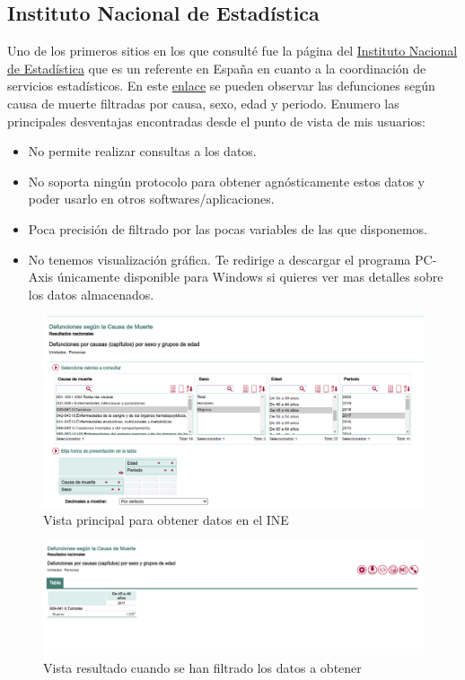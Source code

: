 \subsection{Instituto Nacional de Estadística}
Uno de los primeros sitios en los que consulté fue la página del
\href{https://www.ine.es/index.htm}{Instituto Nacional de Estadística} que es un referente
en España en cuanto a la coordinación de servicios estadísticos. En este
\href{https://www.ine.es/jaxiT3/Tabla.htm?t=6609}{enlace} se pueden observar las
defunciones según causa de muerte filtradas por causa, sexo, edad y periodo. Enumero las
principales desventajas encontradas desde el punto de vista de mis usuarios:
\begin{itemize}
    \item No permite realizar consultas a los datos.
    \item No soporta ningún protocolo para obtener agnósticamente estos datos y poder
    usarlo en otros softwares/aplicaciones.
    \item Poca precisión de filtrado por las pocas variables de las que disponemos.
    \item No tenemos visualización gráfica. Te redirige a descargar el programa PC-Axis
    únicamente disponible para Windows si quieres ver mas detalles sobre los datos
    almacenados.
\end{itemize}
\FloatBarrier
\begin{figure}[]
	\centering
	\includegraphics[scale=0.5]{doc/logos/imgs/ine1.png}
	\caption{  Vista principal para obtener datos en el INE }
    \label{fig:worst_f_value}
\end{figure}

\begin{figure}[]
	\centering
	\includegraphics[scale=0.5]{doc/logos/imgs/ine2.png}
	\caption{ Vista resultado cuando se han filtrado los datos a obtener }
    \label{fig:worst_f_value}
\end{figure}
\FloatBarrier

